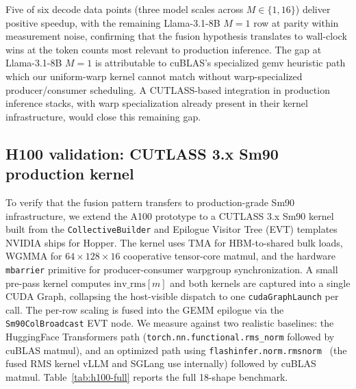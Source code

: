 \documentclass{article}
\begin{document}
Five of six decode data points (three model scales across $M \in \{1, 16\}$) deliver positive speedup, with the remaining Llama-3.1-8B $M{=}1$ row at parity within measurement noise, confirming that the fusion hypothesis translates to wall-clock wins at the token counts most relevant to production inference. The gap at Llama-3.1-8B $M{=}1$ is attributable to cuBLAS's specialized gemv heuristic path which our uniform-warp kernel cannot match without warp-specialized producer/consumer scheduling. A CUTLASS-based integration in production inference stacks, with warp specialization already present in their kernel infrastructure, would close this remaining gap.

\subsection{H100 validation: CUTLASS 3.x Sm90 production kernel}\label{app:h100-cutlass}

To verify that the fusion pattern transfers to production-grade Sm90 infrastructure, we extend the A100 prototype to a CUTLASS 3.x Sm90 kernel built from the \texttt{CollectiveBuilder} and Epilogue Visitor Tree (EVT) templates NVIDIA ships for Hopper. The kernel uses TMA for HBM-to-shared bulk loads, WGMMA for $64{\times}128{\times}16$ cooperative tensor-core matmul, and the hardware \texttt{mbarrier} primitive for producer-consumer warpgroup synchronization. A small pre-pass kernel computes $\mathrm{inv\_rms}[m]$ and both kernels are captured into a single CUDA Graph, collapsing the host-visible dispatch to one \texttt{cudaGraphLaunch} per call. The per-row scaling is fused into the GEMM epilogue via the \texttt{Sm90ColBroadcast} EVT node. We measure against two realistic baselines: the HuggingFace Transformers path (\texttt{torch.nn.functional.rms\_norm} followed by cuBLAS matmul), and an optimized path using \texttt{flashinfer.norm.rmsnorm}~\citep{flashInfer} (the fused RMS kernel vLLM and SGLang use internally) followed by cuBLAS matmul. Table~\ref{tab:h100-full} reports the full 18-shape benchmark.
\end{document}

